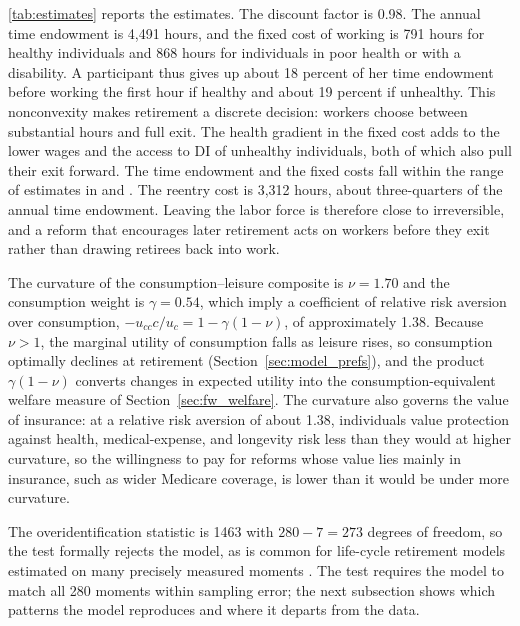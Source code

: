 \autoref{tab:estimates} reports the estimates. The discount factor is 0.98. The annual time endowment is 4,491 hours, and the fixed cost of working is 791 hours for healthy individuals and 868 hours for individuals in poor health or with a disability. A participant thus gives up about 18 percent of her time endowment before working the first hour if healthy and about 19 percent if unhealthy. %
 This nonconvexity makes retirement a discrete decision: workers choose between substantial hours and full exit. The health gradient in the fixed cost adds to the lower wages and the access to DI of unhealthy individuals, both of which also pull their exit forward. The time endowment and the fixed costs fall within the range of estimates in \citet{french2011effects} and \citet{Borella2023}. The reentry cost is 3,312 hours, about three-quarters of the annual time endowment. %
Leaving the labor force is therefore close to irreversible, and a reform that encourages later retirement acts on workers before they exit rather than drawing retirees back into work.

The curvature of the consumption--leisure composite is $\nu=1.70$ and the consumption weight is $\gamma=0.54$, which imply a coefficient of relative risk aversion over consumption, $-u_{cc}c/u_c=1-\gamma(1-\nu)$, of approximately 1.38. Because $\nu>1$, the marginal utility of consumption falls as leisure rises, so consumption optimally declines at retirement (Section~\ref{sec:model_prefs}), and the product $\gamma(1-\nu)$ converts changes in expected utility into the consumption-equivalent welfare measure of Section~\ref{sec:fw_welfare}. The curvature also governs the value of insurance: at a relative risk aversion of about 1.38, individuals value protection against health, medical-expense, and longevity risk less than they would at higher curvature, so the willingness to pay for reforms whose value lies mainly in insurance, such as wider Medicare coverage, is lower than it would be under more curvature.

The overidentification statistic is 1463 with $280-7=273$ degrees of freedom, so the test formally rejects the model, as is common for life-cycle retirement models estimated on many precisely measured moments \citep{french2005effects,french2011effects}. The test requires the model to match all 280 moments within sampling error; the next subsection shows which patterns the model reproduces and where it departs from the data.

